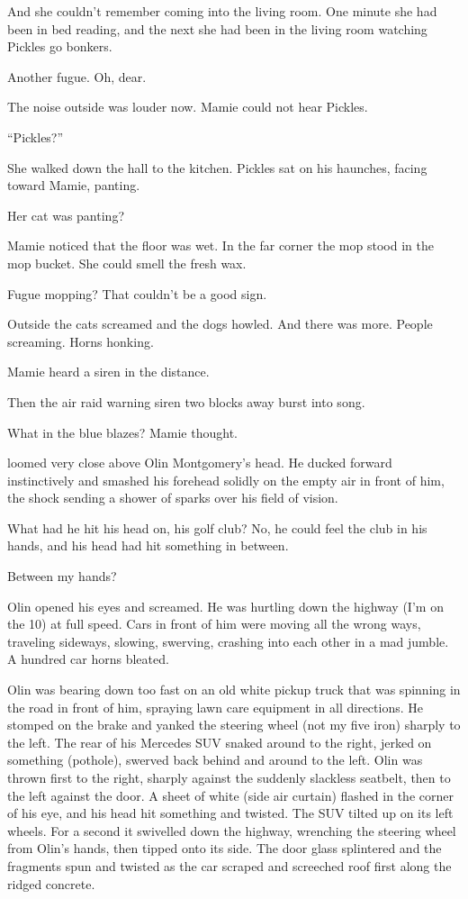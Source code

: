 And she couldn't remember coming into the living room. One minute she had been in bed reading, and the next she had been in the living room watching Pickles go bonkers.

Another fugue. Oh, dear.

The noise outside was louder now. Mamie could not hear Pickles.

``Pickles?''

She walked down the hall to the kitchen. Pickles sat on his haunches, facing toward Mamie, panting.

Her cat was panting?

Mamie noticed that the floor was wet. In the far corner the mop stood in the mop bucket. She could smell the fresh wax.

Fugue mopping? That couldn't be a good sign.

Outside the cats screamed and the dogs howled. And there was more. People screaming. Horns honking.

Mamie heard a siren in the distance.

Then the air raid warning siren two blocks away burst into song.

What in the blue blazes? Mamie thought.




 loomed very close above Olin Montgomery's head. He ducked forward instinctively and smashed his forehead solidly on the empty air in front of him, the shock sending a shower of sparks over his field of vision.

What had he hit his head on, his golf club? No, he could feel the club in his hands, and his head had hit something in between.

Between my hands?

Olin opened his eyes and screamed. He was hurtling down the highway (I'm on the 10) at full speed. Cars in front of him were moving all the wrong ways, traveling sideways, slowing, swerving, crashing into each other in a mad jumble. A hundred car horns bleated.

Olin was bearing down too fast on an old white pickup truck that was spinning in the road in front of him, spraying lawn care equipment in all directions. He stomped on the brake and yanked the steering wheel (not my five iron) sharply to the left. The rear of his Mercedes SUV snaked around to the right, jerked on something (pothole), swerved back behind and around to the left. Olin was thrown first to the right, sharply against the suddenly slackless seatbelt, then to the left against the door. A sheet of white (side air curtain) flashed in the corner of his eye, and his head hit something and twisted. The SUV tilted up on its left wheels. For a second it swivelled down the highway, wrenching the steering wheel from Olin's hands, then tipped onto its side. The door glass splintered and the fragments spun and twisted as the car scraped and screeched roof first along the ridged concrete.

